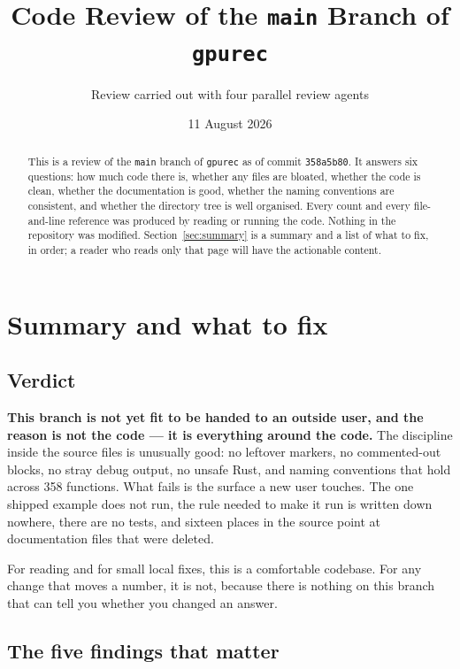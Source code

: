 \documentclass[11pt]{article}
\title{Code Review of the \texttt{main} Branch of \texttt{gpurec}}
\author{Review carried out with four parallel review agents}
\date{11 August 2026}
\begin{document}
\maketitle

\begin{abstract}
This is a review of the \texttt{main} branch of \texttt{gpurec} as of commit
\texttt{358a5b80}.  It answers six questions: how much code there is, whether
any files are bloated, whether the code is clean, whether the documentation is
good, whether the naming conventions are consistent, and whether the directory
tree is well organised.  Every count and every file-and-line reference was
produced by reading or running the code.  Nothing in the repository was
modified.  Section~\ref{sec:summary} is a summary and a list of what to fix, in
order; a reader who reads only that page will have the actionable content.
\end{abstract}

\tableofcontents

\section{Summary and what to fix}
\label{sec:summary}

\subsection*{Verdict}

\textbf{This branch is not yet fit to be handed to an outside user, and the
reason is not the code --- it is everything around the code.}  The discipline
inside the source files is unusually good: no leftover markers, no
commented-out blocks, no stray debug output, no unsafe Rust, and naming
conventions that hold across 358 functions.  What fails is the surface a new
user touches.  The one shipped example does not run, the rule needed to make it
run is written down nowhere, there are no tests, and sixteen places in the
source point at documentation files that were deleted.

For reading and for small local fixes, this is a comfortable codebase.  For any
change that moves a number, it is not, because there is nothing on this branch
that can tell you whether you changed an answer.

\subsection*{The five findings that matter}
\end{document}
